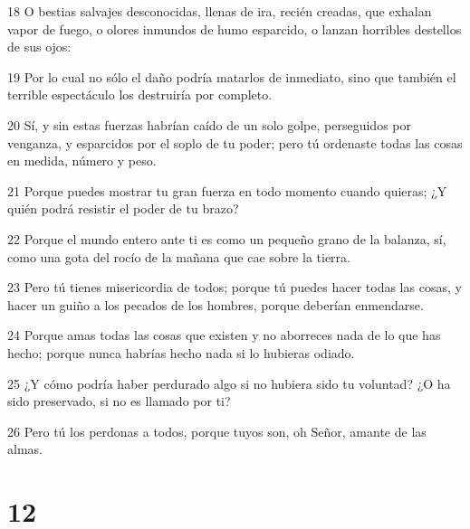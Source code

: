 \par 18 O bestias salvajes desconocidas, llenas de ira, recién creadas, que exhalan vapor de fuego, o olores inmundos de humo esparcido, o lanzan horribles destellos de sus ojos:
\par 19 Por lo cual no sólo el daño podría matarlos de inmediato, sino que también el terrible espectáculo los destruiría por completo.
\par 20 Sí, y sin estas fuerzas habrían caído de un solo golpe, perseguidos por venganza, y esparcidos por el soplo de tu poder; pero tú ordenaste todas las cosas en medida, número y peso.
\par 21 Porque puedes mostrar tu gran fuerza en todo momento cuando quieras; ¿Y quién podrá resistir el poder de tu brazo?
\par 22 Porque el mundo entero ante ti es como un pequeño grano de la balanza, sí, como una gota del rocío de la mañana que cae sobre la tierra.
\par 23 Pero tú tienes misericordia de todos; porque tú puedes hacer todas las cosas, y hacer un guiño a los pecados de los hombres, porque deberían enmendarse.
\par 24 Porque amas todas las cosas que existen y no aborreces nada de lo que has hecho; porque nunca habrías hecho nada si lo hubieras odiado.
\par 25 ¿Y cómo podría haber perdurado algo si no hubiera sido tu voluntad? ¿O ha sido preservado, si no es llamado por ti?
\par 26 Pero tú los perdonas a todos, porque tuyos son, oh Señor, amante de las almas.

\chapter{12}

